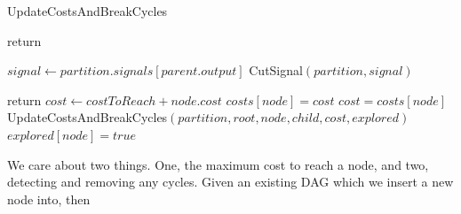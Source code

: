 \documentclass[12pt,final,oneside]{dwThesis} %
\begin{document}
\begin{algorithm}
\begin{center}
      \end{center}
      \caption{UpdateCostsAndBreakCycles}\label{updatecosts}

      \begin{algorithmic}
         [1]    
         \State return \EndIf {} 

         \State $signal \gets partition.signals[parent.output]$  
         \State CutSignal$(partition, signal)$

         \State return \EndIf 
         \State $cost \gets costToReach+node.cost$
         \State $costs[node] = cost$ \Else 
         \State
         $cost = costs[node]$ \EndIf {} 
         \State
         UpdateCostsAndBreakCycles$(partition, root, node, child, cost,
         explored)$ \EndFor 
         \State $explored[node] = true$ \EndProcedure

      \end{algorithmic}

   \end{algorithm}
   We care about two things. One, the
   maximum cost to reach a node, and two, detecting and removing any cycles.
   Given an existing \gls{DAG} which we insert a new node into, then
\end{document}
